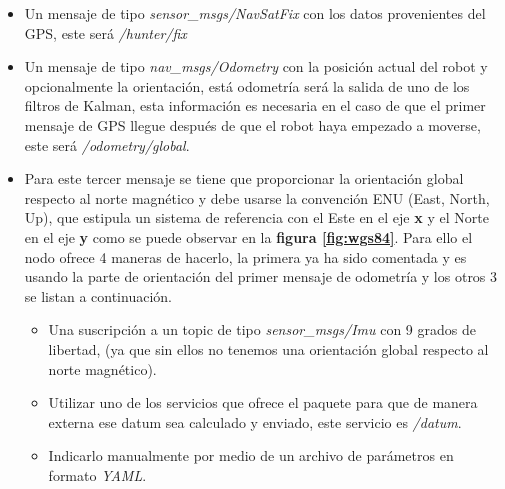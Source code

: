 \begin{itemize}
    \item Un mensaje de tipo \textit{sensor\_msgs/NavSatFix} con los datos provenientes del GPS, este será \textit{/hunter/fix}
    \item Un mensaje de tipo \textit{nav\_msgs/Odometry} con la posición actual del robot y opcionalmente la orientación, está odometría 
será la salida de uno de los filtros de Kalman, esta información es necesaria en el caso de que 
el primer mensaje de GPS llegue después de que el robot haya empezado a moverse, este será \textit{/odometry/global}.
    \item Para este tercer mensaje se tiene que proporcionar la orientación global respecto al norte magnético y debe usarse la 
convención ENU (East, North, Up), que estipula un sistema de referencia con el Este en el eje \textbf{x} y el Norte en el eje \textbf{y} 
como se puede observar en la \textbf{figura \ref{fig:wgs84}}. Para ello el nodo ofrece 4 maneras de hacerlo, la primera ya ha sido 
comentada y es usando la parte de orientación del primer mensaje de odometría y los otros 3 se listan a continuación.
        \begin{itemize}
            \item Una suscripción a un topic de tipo \textit{sensor\_msgs/Imu} con 9 grados de libertad, (ya que sin ellos no tenemos una 
orientación global respecto al norte magnético).
            \item Utilizar uno de los servicios que ofrece el paquete para que de manera externa ese datum sea calculado y enviado, 
este servicio es \textit{/datum}.
            \item Indicarlo manualmente por medio de un archivo de parámetros en formato \textit{YAML}.
        \end{itemize}
\end{itemize}



